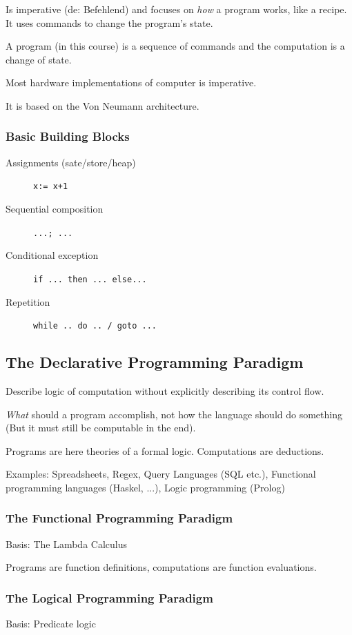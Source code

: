 Is imperative (de: Befehlend) and focuses on \emph{how} a program works, like a recipe. It uses commands to change the program's state.

A program (in this course) is a sequence of commands and the computation is a change of state.

Most hardware implementations of computer is imperative.

It is based on the Von Neumann architecture.

\subsubsection{Basic Building Blocks}

\begin{description}
	\item[Assignments (sate/store/heap)] \lstinline|x:= x+1|
	\item[Sequential composition] \lstinline|...; ...|
	\item[Conditional exception] \lstinline|if ... then ... else...|
	\item[Repetition] \lstinline|while .. do .. / goto ...|
\end{description}



\subsection{The Declarative Programming Paradigm}

Describe logic of computation without explicitly describing its control flow.

\emph{What} should a program accomplish, not how the language should do something (But it must still be computable in the end).

Programs are here theories of a formal logic. Computations are deductions.

Examples: Spreadsheets, Regex, Query Languages (SQL etc.), Functional programming languages (Haskel, ...), Logic programming (Prolog)

\subsubsection{The Functional Programming Paradigm}

Basis: The Lambda Calculus

Programs are function definitions, computations are function evaluations.

\subsubsection{The Logical Programming Paradigm}
Basis: Predicate logic

